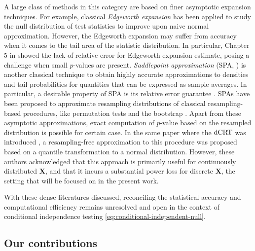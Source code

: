 \documentclass[12pt]{article}
\theoremstyle{definition}
\newcommand{\prx}{\bm X}								%
\newcommand{\dCRT}{\textnormal{dCRT}} 					%
\begin{document}
A large class of methods in this category are based on finer asymptotic expansion techniques. For example, classical \textit{Edgeworth expansion} has been applied to study the null distribution of test statistics \citep{hall2013bootstrap,bentkus1997edgeworth,Bickel1974} to improve upon naive normal approximation. However, the Edgeworth expansion may suffer from accuracy when it comes to the tail area of the statistic distribution. In particular, Chapter 5 in \citet{hall2013bootstrap} showed the lack of relative error for Edgeworth expansion estimate, posing a challenge when small $p$-values are present. \textit{Saddlepoint approximation} (SPA, \citet{Daniels1954,Lugannani1980}) is another classical technique to obtain highly accurate approximations to densities and tail probabilities for quantities that can be expressed as sample averages. In particular, a desirable property of SPA is its relative error guarantee \citep{Butler2007,Kolassa2006}. SPAs have been proposed to approximate resampling distributions of classical resampling-based procedures, like permutation tests \citep{Robinson1982} and the bootstrap \citep{Hinkley1988}. Apart from these asymptotic approximations, exact computation of $p$-value based on the resampled distribution is possible for certain case. In the same paper where the $\dCRT$ was introduced \citep{Liu2022a}, a resampling-free approximation to this procedure was proposed based on a quantile transformation to a normal distribution. However, these authors acknowledged that this approach is primarily useful for continuously distributed $\prx$, and that it incurs a substantial power loss for discrete $\prx$, the setting that will be focused on in the present work. 

With these dense literatures discussed, reconciling the statistical accuracy and computational efficiency remains unresolved and open in the context of conditional independence testing \eqref{eq:conditional-independent-null}. 

\subsection{Our contributions}
\end{document}
